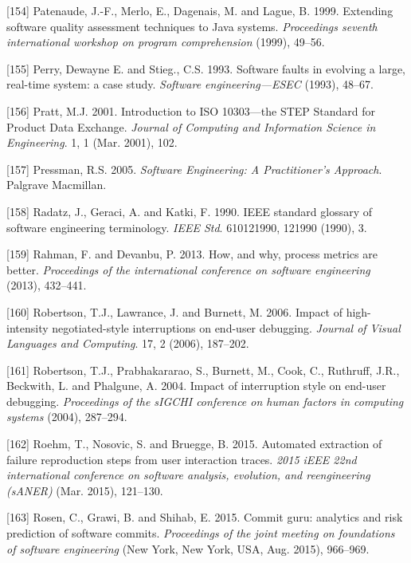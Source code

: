 \documentclass[12pt]{report}
\begin{document}
\hypertarget{ref-Patenaude1999}{}
{[}154{]} Patenaude, J.-F., Merlo, E., Dagenais, M. and Lague, B. 1999.
Extending software quality assessment techniques to Java systems.
\emph{Proceedings seventh international workshop on program
comprehension} (1999), 49--56.

\hypertarget{ref-PerryDewayneE.1993}{}
{[}155{]} Perry, Dewayne E. and Stieg., C.S. 1993. Software faults in
evolving a large, real-time system: a case study. \emph{Software
engineering---ESEC} (1993), 48--67.

\hypertarget{ref-Pratt2001}{}
{[}156{]} Pratt, M.J. 2001. Introduction to ISO 10303---the STEP
Standard for Product Data Exchange. \emph{Journal of Computing and
Information Science in Engineering}. 1, 1 (Mar. 2001), 102.

\hypertarget{ref-Pressman2005}{}
{[}157{]} Pressman, R.S. 2005. \emph{Software Engineering: A
Practitioner's Approach}. Palgrave Macmillan.

\hypertarget{ref-Radatz1990}{}
{[}158{]} Radatz, J., Geraci, A. and Katki, F. 1990. IEEE standard
glossary of software engineering terminology. \emph{IEEE Std}.
610121990, 121990 (1990), 3.

\hypertarget{ref-rahman2013}{}
{[}159{]} Rahman, F. and Devanbu, P. 2013. How, and why, process metrics
are better. \emph{Proceedings of the international conference on
software engineering} (2013), 432--441.

\hypertarget{ref-Robertson2006}{}
{[}160{]} Robertson, T.J., Lawrance, J. and Burnett, M. 2006. Impact of
high-intensity negotiated-style interruptions on end-user debugging.
\emph{Journal of Visual Languages and Computing}. 17, 2 (2006),
187--202.

\hypertarget{ref-Robertson2004}{}
{[}161{]} Robertson, T.J., Prabhakararao, S., Burnett, M., Cook, C.,
Ruthruff, J.R., Beckwith, L. and Phalgune, A. 2004. Impact of
interruption style on end-user debugging. \emph{Proceedings of the
sIGCHI conference on human factors in computing systems} (2004),
287--294.

\hypertarget{ref-Roehm2015}{}
{[}162{]} Roehm, T., Nosovic, S. and Bruegge, B. 2015. Automated
extraction of failure reproduction steps from user interaction traces.
\emph{2015 iEEE 22nd international conference on software analysis,
evolution, and reengineering (sANER)} (Mar. 2015), 121--130.

\hypertarget{ref-Rosen2015}{}
{[}163{]} Rosen, C., Grawi, B. and Shihab, E. 2015. Commit guru:
analytics and risk prediction of software commits. \emph{Proceedings of
the joint meeting on foundations of software engineering} (New York, New
York, USA, Aug. 2015), 966--969.
\end{document}

